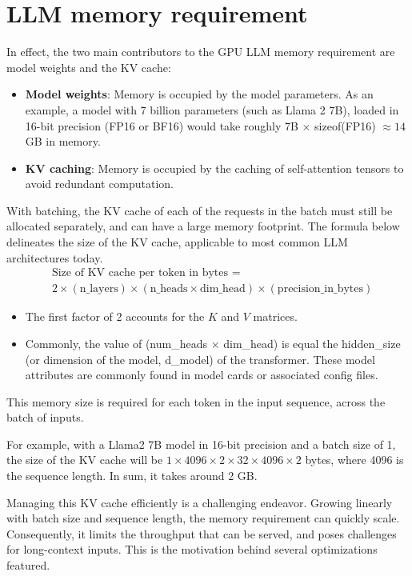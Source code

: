 \section{LLM memory requirement }

In effect, the two main contributors to the GPU LLM memory requirement are model weights and the KV cache:
\begin{itemize}
	\item \textbf{Model weights}: Memory is occupied by the model parameters. As an example, a model with 7 billion parameters (such as Llama 2 7B), loaded in 16-bit precision (FP16 or BF16) would take roughly 7B $\times$ sizeof(FP16) $\approx 14$ GB in memory.
	\item \textbf{KV caching}: Memory is occupied by the caching of self-attention tensors to avoid redundant computation.
\end{itemize}

With batching, the KV cache of each of the requests in the batch must still be allocated separately, and can have a large memory footprint. The formula below delineates the size of the KV cache, applicable to most common LLM architectures today.
\begin{align*}
	&\text{Size of KV cache per token in bytes }=\\
	&2 \times (\text{n\_layers}) \times (\text{n\_heads} \times \text{dim\_head}) \times  (\text{precision\_in\_bytes})
\end{align*}
\begin{itemize}
	\item The first factor of 2 accounts for the $K$ and $V$ matrices. 
	\item Commonly, the value of (num\_heads $\times$ dim\_head) is equal the hidden\_size (or dimension of the model, d\_model) of the transformer. These model attributes are commonly found in model cards or associated config files.
\end{itemize}
This memory size is required for each token in the input sequence, across the batch of inputs. 

For example, with a Llama2 7B model in 16-bit precision and a batch size of 1, the size of the KV cache will be $1 \times 4096 \times 2 \times 32 \times 4096 \times 2$ bytes, where 4096 is the sequence length. In sum, it takes around 2 GB.

Managing this KV cache efficiently is a challenging endeavor. Growing linearly with batch size and sequence length, the memory requirement can quickly scale. Consequently, it limits the throughput that can be served, and poses challenges for long-context inputs. This is the motivation behind several optimizations featured.

